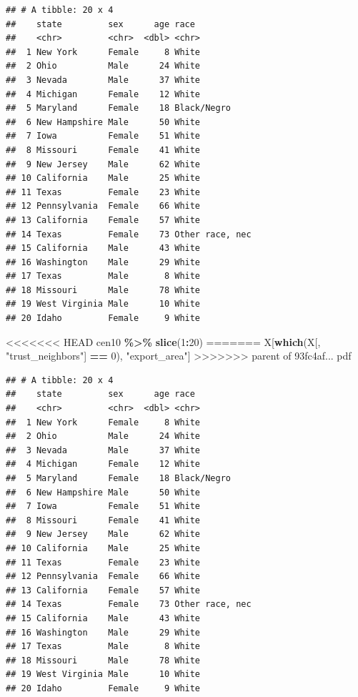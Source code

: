\documentclass[]{book}
\newenvironment{Shaded}{\begin{snugshade}}{\end{snugshade}}
\newcommand{\DecValTok}[1]{\textcolor[rgb]{0.00,0.00,0.81}{#1}}
\newcommand{\KeywordTok}[1]{\textcolor[rgb]{0.13,0.29,0.53}{\textbf{#1}}}
\newcommand{\NormalTok}[1]{#1}
\newcommand{\OperatorTok}[1]{\textcolor[rgb]{0.81,0.36,0.00}{\textbf{#1}}}
\newcommand{\StringTok}[1]{\textcolor[rgb]{0.31,0.60,0.02}{#1}}
\theoremstyle{definition}
\theoremstyle{definition}
\theoremstyle{definition}
\theoremstyle{remark}
\begin{document}
\begin{Shaded}
\begin{Highlighting}[]
\begin{Shaded}
\begin{Highlighting}[]
\begin{verbatim}
## # A tibble: 20 x 4
##    state         sex      age race           
##    <chr>         <chr>  <dbl> <chr>          
##  1 New York      Female     8 White          
##  2 Ohio          Male      24 White          
##  3 Nevada        Male      37 White          
##  4 Michigan      Female    12 White          
##  5 Maryland      Female    18 Black/Negro    
##  6 New Hampshire Male      50 White          
##  7 Iowa          Female    51 White          
##  8 Missouri      Female    41 White          
##  9 New Jersey    Male      62 White          
## 10 California    Male      25 White          
## 11 Texas         Female    23 White          
## 12 Pennsylvania  Female    66 White          
## 13 California    Female    57 White          
## 14 Texas         Female    73 Other race, nec
## 15 California    Male      43 White          
## 16 Washington    Male      29 White          
## 17 Texas         Male       8 White          
## 18 Missouri      Male      78 White          
## 19 West Virginia Male      10 White          
## 20 Idaho         Female     9 White
\end{verbatim}

\begin{Shaded}
\begin{Highlighting}[]
<<<<<<< HEAD
\NormalTok{cen10 }\OperatorTok{\%>\%}\StringTok{ }\KeywordTok{slice}\NormalTok{(}\DecValTok{1}\OperatorTok{:}\DecValTok{20}\NormalTok{)}
=======
\NormalTok{X[}\KeywordTok{which}\NormalTok{(X[, }\StringTok{"trust_neighbors"}\NormalTok{] }\OperatorTok{==}\StringTok{ }\DecValTok{0}\NormalTok{), }\StringTok{"export_area"}\NormalTok{]}
>>>>>>> parent of 93fc4af... pdf
\end{Highlighting}
\end{Shaded}

\begin{verbatim}
## # A tibble: 20 x 4
##    state         sex      age race           
##    <chr>         <chr>  <dbl> <chr>          
##  1 New York      Female     8 White          
##  2 Ohio          Male      24 White          
##  3 Nevada        Male      37 White          
##  4 Michigan      Female    12 White          
##  5 Maryland      Female    18 Black/Negro    
##  6 New Hampshire Male      50 White          
##  7 Iowa          Female    51 White          
##  8 Missouri      Female    41 White          
##  9 New Jersey    Male      62 White          
## 10 California    Male      25 White          
## 11 Texas         Female    23 White          
## 12 Pennsylvania  Female    66 White          
## 13 California    Female    57 White          
## 14 Texas         Female    73 Other race, nec
## 15 California    Male      43 White          
## 16 Washington    Male      29 White          
## 17 Texas         Male       8 White          
## 18 Missouri      Male      78 White          
## 19 West Virginia Male      10 White          
## 20 Idaho         Female     9 White
\end{verbatim}


\end{Highlighting}
\end{Shaded}
\end{Highlighting}
\end{Shaded}
\end{document}
